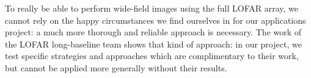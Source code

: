 \pg
To really be able to perform wide-field images using the full LOFAR array, we cannot rely on the happy circumstances we find ourselves in for our applications project: a much more thorough and reliable approach is necessary. The work of the LOFAR long-baseline team  shows that kind of approach: in our project, we test specific strategies and approaches which are complimentary to their work, but cannot be applied more generally without their results.

%
%
%
